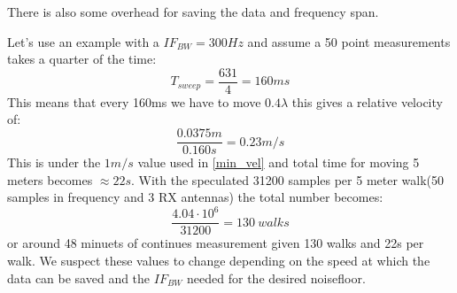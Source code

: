 There is also some overhead for saving the data and frequency span.


Let's use an example with a $IF_{BW} = 300Hz$ and assume a 50 point measurements takes a quarter of the time:
\begin{equation}
T_{sweep} = \frac{631}{4} = 160ms
\end{equation}
This means that every 160ms we have to move $0.4 \lambda$ this gives a relative velocity of:
\begin{equation}
\frac{0.0375m}{0.160s} = 0.23 m/s
\end{equation}
This is under the $1m/s$ value used in \autoref{min_vel}
and total time for moving 5 meters becomes $\approx 22s$.
With the speculated 31200 samples per 5 meter walk(50 samples in frequency and 3 RX antennas) the total number becomes:
\begin{equation}
\frac{4.04 \cdot 10^6}{31200} = 130 \ walks
\end{equation}
or around 48 minuets of continues measurement given 130 walks and 22s per walk. We suspect these values to change depending on the speed at which the data can be saved and the $IF_{BW}$ needed for the desired noisefloor.
